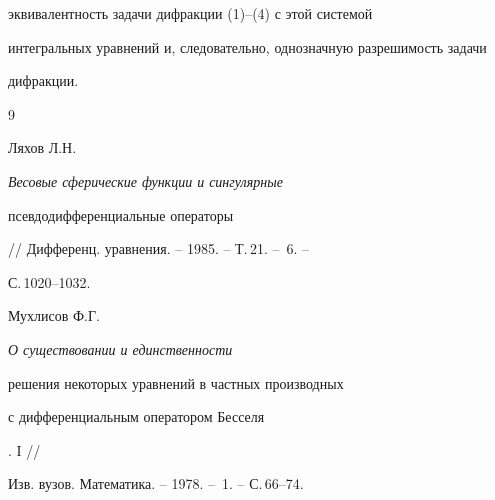 эквивалентность задачи дифракции (1)--(4) с этой системой 


интегральных уравнений и, следовательно, однозначную разрешимость задачи 


дифракции. 





\begin{thebibliography}{9}







Ляхов Л.Н. {\em Весовые сферические функции и сингулярные 


псевдодифференциальные операторы}


// Дифференц. уравнения. -- 1985. -- Т.\,21. -- \No\,6. -- 


С.\,1020--1032.




Мухлисов Ф.Г. {\em О существовании и единственности


решения некоторых уравнений в частных производных 


с дифференциальным оператором Бесселя}. I //


Изв. вузов. Математика. -- 1978. -- \No\,1. -- С.\,66--74.





\end{thebibliography}





\vskip 2cm












\label{end}


















































